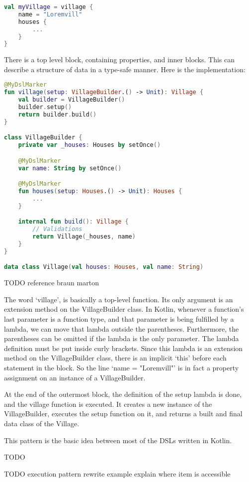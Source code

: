 \begin{lstlisting}[caption={Example DSL usage},language=Kotlin,label=code:pattern_example_usage]
val myVillage = village {
    name = "Loremvill"
    houses {
        ...
    }
}
\end{lstlisting}

There is a top level block, containing properties, and inner blocks. This can describe a structure of data in a type-safe manner. Here is the implementation:

\begin{lstlisting}[caption={Pattern example},language=Kotlin,label=code:pattern_example_impl]
@MyDslMarker
fun village(setup: VillageBuilder.() -> Unit): Village {
    val builder = VillageBuilder()
    builder.setup()
    return builder.build()
}

class VillageBuilder {
    private var _houses: Houses by setOnce()

    @MyDslMarker
    var name: String by setOnce()

    @MyDslMarker
    fun houses(setup: Houses.() -> Unit): Houses {
        ...
    }

    internal fun build(): Village {
        // Validations
        return Village(_houses, name)
    }
}

data class Village(val houses: Houses, val name: String)
\end{lstlisting}

TODO reference braun marton

The word `village', is basically a top-level function. Its only argument is an extension method on the VillageBuilder class. In Kotlin, whenever a function's last parameter is a function type, and that parameter is being fulfilled by a lambda, we can move that lambda outside the parentheses. Furthermore, the parentheses can be omitted if the lambda is the only parameter. The lambda definition must be put inside curly brackets. Since this lambda is an extension method on the VillageBuilder class, there is an implicit `this' before each statement in the block. So the line `name = "Loremvill"' is in fact a property assignment on an instance of a VillageBuilder.

At the end of the outermost block, the definition of the setup lambda is done, and the village function is executed. It creates a new instance of the VillageBuilder, executes the setup function on it, and returns a built and final data class of the Village.

This pattern is the basic idea between most of the DSLs written in Kotlin.

TODO

TODO execution pattern
    rewrite example
    explain where item is accessible


